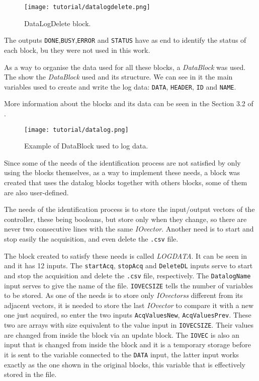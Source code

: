 \begin{figure}[H] \centering
 \texttt{[image: tutorial/datalogdelete.png]}
  \caption{DataLogDelete block.}
  \label{fig:datalogdelete}
\end{figure}
The outputs \verb|DONE|,\verb|BUSY|,\verb|ERROR| and \verb|STATUS| have as end
to identify the status of each block, bu they were not used in this work.

As a way to organise the data used for all these blocks, a \emph{DataBlock} was
used. The  show the \emph{DataBlock} used and its
structure. We can see in it the main variables used to create
and write the log data: \verb|DATA|, \verb|HEADER|, \verb|ID| and \verb|NAME|.

More information about the blocks and its data can be seen in the Section 3.2 of
\cite{datalogSiemens}.

\begin{figure}[H] \centering
 \texttt{[image: tutorial/datalog.png]}
  \caption{Example of DataBlock used to log data.}
  \label{fig:exampleDataBlock}
\end{figure}

Since some of the needs of the identification process are not satisfied by
only using the blocks themselves, as a way to implement these needs, a block was created
that uses the datalog blocks together with others blocks, some of them are also
user-defined.

The needs of the identification process is to store the input\slash output
vectors of the controller, these being booleans, but store only when they
change, so there are never two consecutive lines with the same \emph{IOvector}.
Another need is to start and stop easily the acquisition, and even delete the
\verb|.csv| file.

The block created to satisfy these needs is called \emph{LOGDATA}. It can be seen in
 and it has 12 inputs. The \verb|startAcq|,
\verb|stopAcq| and \verb|DeleteDL| inputs serve to start and stop the acquisition and
delete the \verb|.csv| file, respectively. The \verb|DatalogName| input serves
to give the name of the file. \verb|IOVECSIZE| tells the number of variables to
be stored. As one of the needs is to store only \emph{IOvectorss} different from its
adjacent vectors, it is needed to store the last \emph{IOvector} to compare it with a
new one just acquired, so enter the two inputs \verb|AcqValuesNew|,
\verb|AcqValuesPrev|. These two are arrays with size equivalent to the value
input in \verb|IOVECSIZE|. Their values are
changed from inside the block via an update block.
The \verb|IOVEC| is also an input that is changed from inside the block and it
is a temporary storage before it is sent to the variable connected to the
\verb|DATA| input, the latter input works exactly as the one shown in the
original blocks, this variable that is effectively stored in the file.


